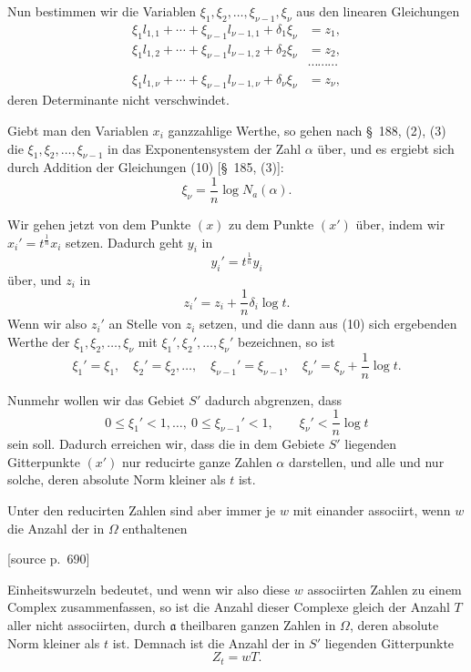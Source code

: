 \documentclass[11pt]{article}
\newcommand{\Na}{N_a}
\newcommand{\srcpage}[1]{\par\medskip\noindent\textsf{[source p.~#1]}\par\smallskip}
\begin{document}
Nun bestimmen wir die Variablen $\xi_1,\xi_2,\ldots,\xi_{\nu-1},\xi_\nu$ aus den linearen Gleichungen
\begin{equation}
\begin{aligned}
\xi_1l_{1,1}+\cdots+\xi_{\nu-1}l_{\nu-1,1}+\delta_1\xi_\nu&=z_1,\\
\xi_1l_{1,2}+\cdots+\xi_{\nu-1}l_{\nu-1,2}+\delta_2\xi_\nu&=z_2,\\
&\cdots\cdots\cdots\\
\xi_1l_{1,\nu}+\cdots+\xi_{\nu-1}l_{\nu-1,\nu}+\delta_\nu\xi_\nu&=z_\nu,
\end{aligned}
\tag{10}
\end{equation}
deren Determinante nicht verschwindet.

Giebt man den Variablen $x_i$ ganzzahlige Werthe, so gehen nach \S~188, (2), (3) die $\xi_1,\xi_2,\ldots,\xi_{\nu-1}$ in das Exponentensystem der Zahl $\alpha$ über, und es ergiebt sich durch Addition der Gleichungen (10) [\S~185, (3)]:
\begin{equation}
\xi_\nu=\frac1n\log \Na(\alpha).
\tag{11}
\end{equation}

Wir gehen jetzt von dem Punkte $(x)$ zu dem Punkte $(x')$ über, indem wir $x_i'=t^{\frac1n}x_i$ setzen. Dadurch geht $y_i$ in
\[
y_i'=t^{\frac1n}y_i
\]
über, und $z_i$ in
\[
z_i'=z_i+\frac1n\delta_i\log t.
\]
Wenn wir also $z_i'$ an Stelle von $z_i$ setzen, und die dann aus (10) sich ergebenden Werthe der $\xi_1,\xi_2,\ldots,\xi_\nu$ mit $\xi_1',\xi_2',\ldots,\xi_\nu'$ bezeichnen, so ist
\begin{equation}
\xi_1'=\xi_1,
\quad \xi_2'=\xi_2,
\ldots,
\quad \xi_{\nu-1}'=\xi_{\nu-1},
\quad \xi_\nu'=\xi_\nu+\frac1n\log t.
\tag{12}
\end{equation}

Nunmehr wollen wir das Gebiet $S'$ dadurch abgrenzen, dass
\begin{equation}
0\leq\xi_1'<1,\ldots,\ 0\leq\xi_{\nu-1}'<1,
\qquad
\xi_\nu'<\frac1n\log t
\tag{13}
\end{equation}
sein soll. Dadurch erreichen wir, dass die in dem Gebiete $S'$ liegenden Gitterpunkte $(x')$ nur reducirte ganze Zahlen $\alpha$ darstellen, und alle und nur solche, deren absolute Norm kleiner als $t$ ist.

Unter den reducirten Zahlen sind aber immer je $w$ mit einander associirt, wenn $w$ die Anzahl der in $\Omega$ enthaltenen

\srcpage{690}
Einheitswurzeln bedeutet, und wenn wir also diese $w$ associirten Zahlen zu einem Complex zusammenfassen, so ist die Anzahl dieser Complexe gleich der Anzahl $T$ aller nicht associirten, durch $\mathfrak a$ theilbaren ganzen Zahlen in $\Omega$, deren absolute Norm kleiner als $t$ ist. Demnach ist die Anzahl der in $S'$ liegenden Gitterpunkte
\begin{equation}
Z_t=wT.
\tag{14}
\end{equation}
\end{document}
